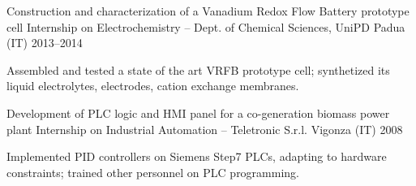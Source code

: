 \begin{cventries}
    \cventry%
        {Construction and characterization of a Vanadium Redox Flow Battery prototype cell}
        {Internship on Electrochemistry -- Dept. of Chemical Sciences, UniPD}
        {Padua (IT)}
        {2013--2014}
        {\begin{cvitems}
            \item Assembled and tested a state of the art VRFB prototype cell; synthetized its liquid electrolytes, electrodes, cation exchange membranes.
        \end{cvitems}}

    \cventry%
        {Development of PLC logic and HMI panel for a co-generation biomass power plant}
        {Internship on Industrial Automation -- Teletronic S.r.l.}
        {Vigonza (IT)}
        {2008}
        {\begin{cvitems}
            \item Implemented PID controllers on Siemens Step7 PLCs, adapting to hardware constraints; trained other personnel on PLC programming.
        \end{cvitems}}

\end{cventries}
